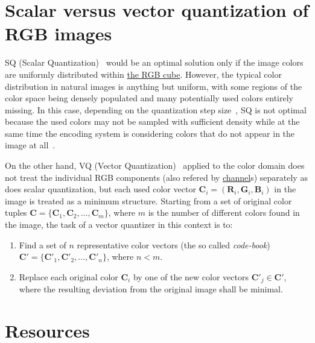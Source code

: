 
\section{Scalar versus vector quantization of RGB images}

SQ (Scalar
Quantization)~\cite{vruiz__scalar_quantization,sayood2017introduction}
would be an optimal solution only if the image colors are uniformly
distributed within
\href{https://en.wikipedia.org/wiki/RGB_color_model}{the RGB
  cube}. However, the typical color distribution in natural images is
anything but uniform, with some regions of the color space being
densely populated and many potentially used colors entirely
missing. In this case, depending on the quantization step
size~\cite{vruiz__signal_quantization}, SQ is not optimal because the
used colors may not be sampled with suﬃcient density while at the same
time the encoding system is considering colors that do not appear in
the image at all~\cite{burger2016digital}.

On the other hand, VQ (Vector
Quantization)~\cite{vruiz__vector_quantization,sayood2017introduction}
applied to the color domain does not treat the individual RGB
components (also refered by
\href{https://en.wikipedia.org/wiki/Color_image}{channel}s) separately
as does scalar quantization, but each used color vector ${\mathbf C}_i
= ({\mathbf R}_i, {\mathbf G}_i, {\mathbf B}_i )$ in the image is
treated as a minimum structure. Starting from a set of original color
tuples ${\mathbf C} = \{{\mathbf C}_1, {\mathbf C}_2, \ldots ,{\mathbf
  C}_m\}$, where $m$ is the number of different colors found in the
image, the task of a vector quantizer in this context is to:
\begin{enumerate}
\item Find a set of $n$ representative color vectors (the so called
  \emph{code-book}) ${\mathbf C}' = \{{\mathbf C}'_1, {\mathbf C}'_2
  ,\ldots , {\mathbf C}'_n \}$, where $n < m$.
\item Replace each original color ${\mathbf C}_i$ by one of the new
  color vectors ${\mathbf C}'_j\in {\mathbf C}'$, where the resulting
  deviation from the original image shall be minimal.
\end{enumerate}



\section{Resources}

